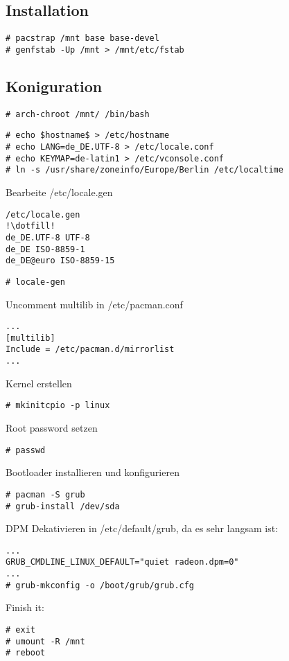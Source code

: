 \subsection{Installation}
\label{subsec:installation}
\begin{lstlisting}[style=Bash]
# pacstrap /mnt base base-devel 
# genfstab -Up /mnt > /mnt/etc/fstab 
\end{lstlisting}

\subsection{Koniguration}
\label{subsec:config}
\begin{lstlisting}[style=Bash]
# arch-chroot /mnt/ /bin/bash
\end{lstlisting}
\begin{lstlisting}[style=Bash]
# echo $hostname$ > /etc/hostname
# echo LANG=de_DE.UTF-8 > /etc/locale.conf
# echo KEYMAP=de-latin1 > /etc/vconsole.conf
# ln -s /usr/share/zoneinfo/Europe/Berlin /etc/localtime
\end{lstlisting}
Bearbeite /etc/locale.gen
\begin{lstlisting}[style=Bash]
/etc/locale.gen
!\dotfill!
de_DE.UTF-8 UTF-8
de_DE ISO-8859-1
de_DE@euro ISO-8859-15
\end{lstlisting}
\begin{lstlisting}[style=Bash]
# locale-gen 
\end{lstlisting}
Uncomment multilib in /etc/pacman.conf
\begin{lstlisting}[style=Bash]
...
[multilib]
Include = /etc/pacman.d/mirrorlist
...
\end{lstlisting}
Kernel erstellen
\begin{lstlisting}[style=Bash]
# mkinitcpio -p linux
\end{lstlisting}
Root password setzen 
\begin{lstlisting}[style=Bash]
# passwd
\end{lstlisting}
Bootloader installieren und konfigurieren
\begin{lstlisting}[style=Bash]
# pacman -S grub 
# grub-install /dev/sda 
\end{lstlisting}
DPM Dekativieren in /etc/default/grub, da es sehr langsam ist:
\begin{lstlisting}[style=Bash]
...
GRUB_CMDLINE_LINUX_DEFAULT="quiet radeon.dpm=0"
...
# grub-mkconfig -o /boot/grub/grub.cfg 
\end{lstlisting}
Finish it:
\begin{lstlisting}[style=Bash]
# exit 
# umount -R /mnt
# reboot 
\end{lstlisting}


